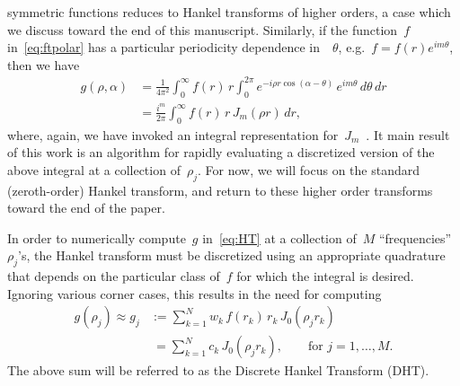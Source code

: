 symmetric functions reduces to Hankel transforms of higher orders, a case which
we discuss toward the end of this manuscript. Similarly, if the function~$f$
in~\eqref{eq:ftpolar} has a particular periodicity dependence in~~$\theta$,
e.g.~$f = f(r)e^{im\theta}$, then we have
\begin{equation}
  \begin{aligned}
  g(\rho,\alpha) &= \frac{1}{4\pi^2} \int_0^\infty f(r) \, r \int_0^{2\pi} 
  e^{-i \rho r \cos(\alpha - \theta) } \, e^{im\theta}  \, d\theta \, dr \\
  &= \frac{i^m}{2\pi} \int_0^\infty f(r) \, r \, J_m(\rho r)  \, dr,
  \end{aligned}
\end{equation}
where, again, we have invoked an integral representation
for~$J_m$~\cite{olver2010nist}. 
It main result of this work is an algorithm for rapidly evaluating a discretized
version of the above integral at a collection of~$\rho_j$.
For now, we will focus on the standard
(zeroth-order) Hankel transform, and return to these higher order transforms
toward the end of the paper.

In order to numerically compute~$g$ in~\eqref{eq:HT} at a collection of~$M$
``frequencies''~$\rho_j$'s, the Hankel transform must be discretized using an
appropriate quadrature that depends on the particular class of~$f$ for which the
integral is desired. Ignoring various corner cases, this results in the need for
computing
\begin{equation} \label{eq:DHT}
  \begin{aligned}
  g(\rho_j) \approx 
  g_j &:= \sum_{k=1}^N w_k \, f(r_k) \, r_k \, J_0(\rho_j r_k) \\
  &\ = \sum_{k=1}^N c_k \, J_0(\rho_j r_k),
   \qquad \text{for } j = 1, \ldots, M.
  \end{aligned}
\end{equation}
The above sum will be referred to as the Discrete Hankel Transform (DHT). 


